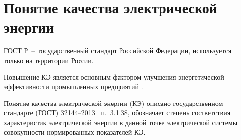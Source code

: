 



\section{Понятие качества электрической энергии}\label{sec:ch4/sect1} 
ГОСТ Р~--~государственный стандарт Российской Федерации, используется только на территории России.

Повышение КЭ является основным фактором улучшения энергетической эффективности промышленных предприятий \cite{Energy_Saving2009}. 

Понятие качества электрической энергии (КЭ) описано государственном стандарте (ГОСТ) 32144--2013~\cite{GOST32144-2013} п.~3.1.38, обозначает степень соответствия характеристик электрической энергии в данной точке электрической системы совокупности нормированных показателей КЭ.

